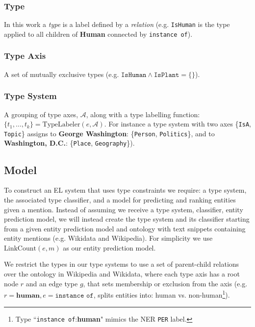 \documentclass[letterpaper]{article}
\begin{document}
\subsubsection{Type} In this work a {\em type} is a label defined by a {\em relation} (e.g. {\tt IsHuman}  is the type applied to all children of {\bf Human} connected by {\tt instance of}).

\subsubsection{Type Axis} A set of mutually exclusive types (e.g. $\texttt{IsHuman} \land \texttt{IsPlant} = \{\}$).

\subsubsection{Type System} A grouping of type axes, $\mathcal{A}$, along with a type labelling function: $\{t_1, \dots, t_k\} = \mathrm{TypeLabeler}(e, \mathcal{A})$. For instance a type system with two axes \{\texttt{IsA}, \texttt{Topic}\} assigns to \textbf{George Washington}: \{\texttt{Person}, \texttt{Politics}\}, and to \textbf{Washington, D.C.}: \{\texttt{Place},  \texttt{Geography}\}).

\subsection{Model}



To construct an EL system that uses type constraints we require: a type system, the associated type classifier, and a model for predicting and ranking entities given a mention.
Instead of assuming we receive a type system, classifier, entity prediction model, we will instead create the type system and its classifier starting from a given entity prediction model and ontology with text snippets containing entity mentions (e.g. Wikidata and Wikipedia). For simplicity we use $\mathrm{LinkCount}(e, m)$ as our entity prediction model.

We restrict the types in our type systems to use a set of parent-child relations over the ontology in Wikipedia and Wikidata, where each type axis has a root node $r$ and an edge type $g$, that sets membership or exclusion from the axis (e.g. $r=\textbf{human}, e=\texttt{instance of}$, splits entities into: human vs. non-human\footnote{Type ``\texttt{instance of}:\textbf{human}" mimics the NER  \texttt{PER} label.}).
\end{document}
